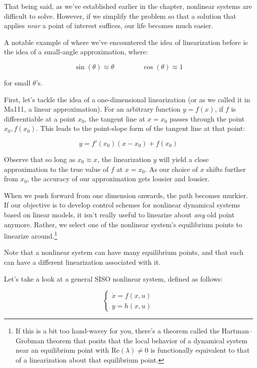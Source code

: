 \documentclass[
  letterpaper,
  DIV=11,
  numbers=noendperiod]{scrreprt}
\begin{document}
That being said, as we've established earlier in the chapter, nonlinear
systems are difficult to solve. However, if we simplify the problem so
that a solution that applies \emph{near} a point of interest suffices,
our life becomes much easier.

A notable example of where we've encountered the idea of linearization
before is the idea of a small-angle approximation, where:

\[\sin(\theta) \approx \theta \qquad \qquad \cos(\theta) \approx 1\]

for small \(\theta\)'s.

First, let's tackle the idea of a one-dimensional linearization (or as
we called it in Ma111, a linear approximation). For an arbitrary
function \(y = f(x)\), if \(f\) is differentiable at a point \(x_0\),
the tangent line at \(x=x_0\) passes through the point \(x_0, f(x_0)\).
This leads to the point-slope form of the tangent line at that point:

\[y = f'(x_0) (x-x_0) + f(x_0)\]

Observe that so long as \(x_0 \approx x\), the linearization \(y\) will
yield a close approximation to the true value of \(f\) at \(x = x_0\).
As our choice of \(x\) shifts further from \(x_0\), the accuracy of our
approximation gets lousier and lousier.

When we push forward from one dimension onwards, the path becomes
murkier. If our objective is to develop control schemes for nonlinear
dynamical systems based on linear models, it isn't really useful to
linearize about \emph{any} old point anymore. Rather, we select one of
the nonlinear system's equilibrium points to linearize
around.\footnote{If this is a bit too hand-wavey for you, there's a
  theorem called the Hartman--Grobman theorem that posits that the local
  behavior of a dynamical system near an equilibrium point with
  \(\text{Re}(\lambda) \neq 0\) is functionally equivalent to that of a
  linearization about that equilibrium point.}

Note that a nonlinear system can have many equilibrium points, and that
each can have a different linearization associated with it.

Let's take a look at a general SISO nonlinear system, defined as
follows:

\begin{equation*}
    \left\{ \begin{array}{ll}
        \dot{x} = f(x, u) \\
        y = h(x, u)
    \end{array} \right.
\end{equation*}
\end{document}
